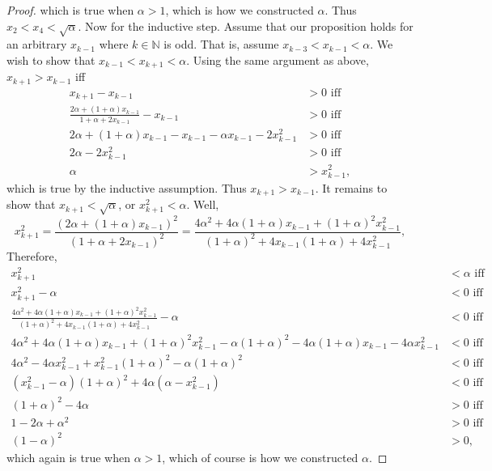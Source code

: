 \documentclass[11pt]{amsart}
\begin{document}
\begin{proof}
  which is true when $\alpha > 1$, which is how we constructed $\alpha$. Thus $x_{2} < x_{4} < \sqrt{\alpha}$. Now for the inductive step. Assume that our proposition holds for an arbitrary $x_{k-1}$ where $k \in \mathbb{N}$ is odd. That is, assume $x_{k-3} < x_{k-1} < \alpha$. We wish to show that $x_{k-1} < x_{k+1} < \alpha$. Using the same argument as above, $x_{k+1} > x_{k-1}$ iff 
  \begin{align*}
    x_{k+1} - x_{k-1} & > 0 \text{ iff} \\
    \frac{2\alpha + (1+\alpha)x_{k-1}}{1 + \alpha + 2x_{k-1}} - x_{k-1} & > 0 \text{ iff} \\
    2\alpha + (1+\alpha)x_{k-1} - x_{k-1} - \alpha x_{k-1} - 2x_{k-1}^{2} & > 0 \text{ iff} \\
    2\alpha - 2x_{k-1}^{2} & > 0 \text{ iff} \\
    \alpha & > x_{k-1}^{2},
  \end{align*}
  which is true by the inductive assumption. Thus $x_{k+1} > x_{k-1}$. It remains to show that $x_{k+1} < \sqrt{\alpha}$, or $x_{k+1}^{2} < \alpha$. Well,
  \[ x_{k+1}^{2} = \frac{(2\alpha + (1+\alpha)x_{k-1})^{2}}{(1 + \alpha + 2x_{k-1})^{2}} = \frac{4\alpha^{2} + 4\alpha(1+\alpha)x_{k-1} + (1+\alpha)^{2}x_{k-1}^{2}}{(1+\alpha)^{2} + 4x_{k-1}(1+\alpha) + 4x_{k-1}^{2}}, \]
  Therefore,
  \begin{align*}
    x_{k+1}^{2} & < \alpha \text{ iff} \\
    x_{k+1}^{2} - \alpha & < 0 \text{ iff} \\
    \frac{4\alpha^{2} + 4\alpha(1+\alpha)x_{k-1} + (1+\alpha)^{2}x_{k-1}^{2}}{(1+\alpha)^{2} + 4x_{k-1}(1+\alpha) + 4x_{k-1}^{2}} - \alpha & < 0 \text{ iff} \\
    4\alpha^{2} + 4\alpha(1+\alpha)x_{k-1} + (1+\alpha)^{2}x_{k-1}^{2} - \alpha(1+\alpha)^{2} - 4\alpha(1+\alpha)x_{k-1} - 4\alpha x_{k-1}^{2} & < 0\text{ iff} \\
    4\alpha^{2} - 4\alpha x_{k-1}^{2} + x_{k-1}^{2}(1+\alpha)^{2} - \alpha(1+\alpha)^{2} & < 0 \text{ iff} \\
    (x_{k-1}^{2} - \alpha)(1+\alpha)^{2} + 4\alpha(\alpha - x_{k-1}^{2}) & < 0 \text{ iff} \\
    (1 + \alpha)^{2} - 4\alpha & > 0 \text{ iff} \\
    1 - 2\alpha + \alpha^{2} & > 0 \text{ iff} \\
    (1 - \alpha)^{2} & > 0,
  \end{align*}
  which again is true when $\alpha > 1$, which of course is how we constructed $\alpha$.
\end{proof}
\end{document}
